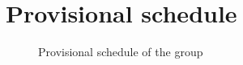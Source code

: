 
\newpage

\tableofcontents

\clearpage

\listoffigures
\clearpage



\clearpage
\section{Provisional schedule}

\begin{figure}[h]
		
		\vspace{12,2cm}
		\caption{Provisional schedule of the group}
\end{figure}

